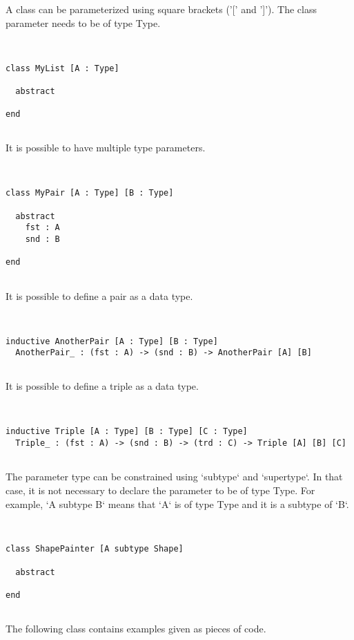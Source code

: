 \documentclass[12pt,a4paper]{article}
\begin{document}
A class can be parameterized using square brackets ('[' and ']').
 The class parameter needs to be of type Type.


\begin{lstlisting}


class MyList [A : Type]

  abstract

end


\end{lstlisting}

It is possible to have multiple type parameters.


\begin{lstlisting}


class MyPair [A : Type] [B : Type]

  abstract
    fst : A
    snd : B

end


\end{lstlisting}

It is possible to define a pair as a data type.


\begin{lstlisting}


inductive AnotherPair [A : Type] [B : Type]
  AnotherPair_ : (fst : A) -> (snd : B) -> AnotherPair [A] [B]


\end{lstlisting}

It is possible to define a triple as a data type.


\begin{lstlisting}


inductive Triple [A : Type] [B : Type] [C : Type]
  Triple_ : (fst : A) -> (snd : B) -> (trd : C) -> Triple [A] [B] [C]


\end{lstlisting}

The parameter type can be constrained using `subtype` and `supertype`.
 In that case, it is not necessary to declare the parameter to be of type Type.
 For example, `A subtype B` means that `A` is of type Type and it is a subtype of `B`.


\begin{lstlisting}


class ShapePainter [A subtype Shape]

  abstract

end


\end{lstlisting}

The following class contains examples given as pieces of code.
\end{document}
